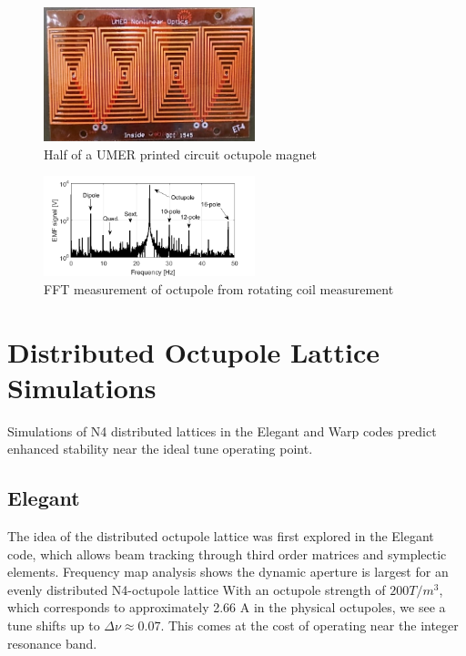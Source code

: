 \begin{figure}[!htb]
   \centering
   \includegraphics*[width=174pt]{6.figures/octupole_PCB}
   \caption{Half of a UMER printed circuit octupole magnet}
   \label{pcb}
\end{figure}

\begin{figure}[!htb]
   \centering
   \includegraphics*[width=174pt]{6.figures/OctupoleFFTreal}
   \caption{FFT measurement of octupole from rotating coil measurement}
   \label{rotcoil}
\end{figure}


\section{Distributed Octupole Lattice Simulations}

Simulations of N4 distributed lattices in the Elegant and Warp codes predict enhanced stability near the ideal tune operating point.

\subsection{Elegant}

The idea of the distributed octupole lattice was first explored in the Elegant code, which allows beam tracking through third order matrices and symplectic elements.\cite{elegant} Frequency map analysis shows the dynamic aperture is largest for an evenly distributed N4-octupole lattice With an octupole strength of $200 T/m^3$, which corresponds to approximately 2.66 A in the physical octupoles, we see a tune shifts up to $ \Delta \nu \approx 0.07$. This comes at the cost of operating near the integer resonance band. 

